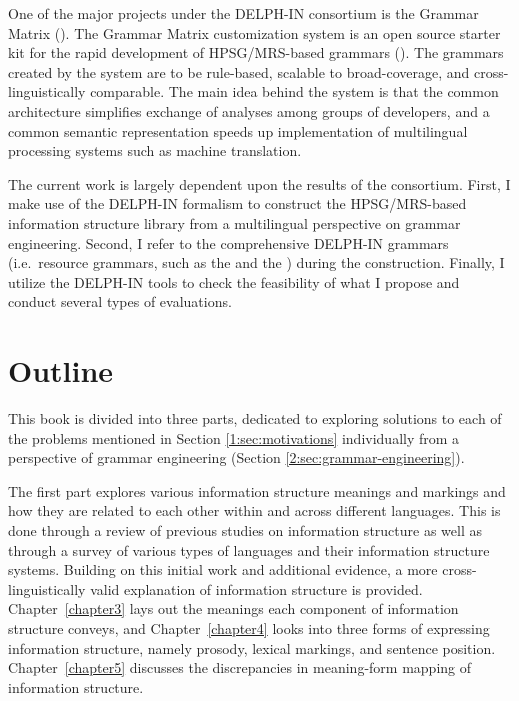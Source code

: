 One of the major projects under the DELPH-IN consortium is the \lingo
Grammar Matrix (\citealt{bender:etal:10}).  The \lingo Grammar Matrix
customization system is an open source starter kit for the rapid
development of HPSG/MRS-based grammars
().  The grammars
created by the system are to be rule-based, scalable to
broad-coverage, and cross-linguisti\-cally comparable. The main idea
behind the system is that the common architecture simplifies exchange
of analyses among groups of developers, and a common semantic
representation speeds up implementation of multilingual processing
systems such as machine translation.



The current work is largely dependent upon the results of the
 consortium.  First, I make use of the DELPH-IN
formalism to construct the HPSG/MRS-based information structure
library from a multilingual perspective on grammar
engineering. Second, I refer to the comprehensive DELPH-IN grammars
(i.e.\ resource grammars, such as the  and the )
during the construction. Finally, I utilize the DELPH-IN tools to
check the feasibility of what I propose and conduct several types of
evaluations.





\section{Outline}
\label{1:sec:outlines}

This book is divided into three parts, dedicated to exploring
solutions to each of the problems mentioned in Section \ref{1:sec:motivations}
individually from a perspective of grammar engineering
(Section \ref{2:sec:grammar-engineering}).


The first part explores various information structure meanings and
markings and how they are related to each other within and across
different languages.  This is done through a review of previous
studies on information structure as well as through a survey of
various types of languages and their information structure
systems. Building on this initial work and additional evidence, a more
cross-linguistically valid explanation of information structure is
provided. Chapter~\ref{chapter3} lays out the meanings each component
of information structure conveys, and Chapter~\ref{chapter4} looks
into three forms of expressing information structure, namely prosody,
lexical markings, and sentence position.  Chapter~\ref{chapter5}
discusses the discrepancies in meaning-form mapping of information
structure.




